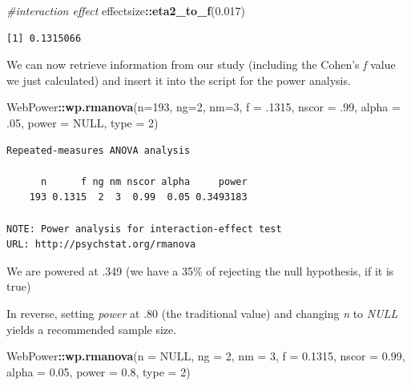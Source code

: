 \documentclass[
  11pt,
]{book}
\newenvironment{Shaded}{\begin{snugshade}}{\end{snugshade}}
\newcommand{\AttributeTok}[1]{\textcolor[rgb]{0.27,0.27,0.27}{#1}}
\newcommand{\CommentTok}[1]{\textcolor[rgb]{0.37,0.37,0.37}{\textit{#1}}}
\newcommand{\ConstantTok}[1]{\textcolor[rgb]{0.37,0.37,0.37}{#1}}
\newcommand{\DecValTok}[1]{\textcolor[rgb]{0.06,0.06,0.06}{#1}}
\newcommand{\FloatTok}[1]{\textcolor[rgb]{0.06,0.06,0.06}{#1}}
\newcommand{\FunctionTok}[1]{\textcolor[rgb]{0.27,0.27,0.27}{\textbf{#1}}}
\newcommand{\NormalTok}[1]{#1}
\newcommand{\SpecialCharTok}[1]{\textcolor[rgb]{0.43,0.43,0.43}{\textbf{#1}}}
\begin{document}
\begin{Shaded}
\begin{Highlighting}[]
\CommentTok{\#interaction effect}
\NormalTok{effectsize}\SpecialCharTok{::}\FunctionTok{eta2\_to\_f}\NormalTok{(}\FloatTok{0.017}\NormalTok{) }
\end{Highlighting}
\end{Shaded}

\begin{verbatim}
[1] 0.1315066
\end{verbatim}

We can now retrieve information from our study (including the Cohen's \emph{f} value we just calculated) and insert it into the script for the power analysis.

\begin{Shaded}
\begin{Highlighting}[]
\NormalTok{WebPower}\SpecialCharTok{::}\FunctionTok{wp.rmanova}\NormalTok{(}\AttributeTok{n=}\DecValTok{193}\NormalTok{, }\AttributeTok{ng=}\DecValTok{2}\NormalTok{, }\AttributeTok{nm=}\DecValTok{3}\NormalTok{, }\AttributeTok{f =}\NormalTok{ .}\DecValTok{1315}\NormalTok{, }\AttributeTok{nscor =}\NormalTok{ .}\DecValTok{99}\NormalTok{, }\AttributeTok{alpha =}\NormalTok{ .}\DecValTok{05}\NormalTok{, }\AttributeTok{power =} \ConstantTok{NULL}\NormalTok{, }\AttributeTok{type =} \DecValTok{2}\NormalTok{)}
\end{Highlighting}
\end{Shaded}

\begin{verbatim}
Repeated-measures ANOVA analysis

      n      f ng nm nscor alpha     power
    193 0.1315  2  3  0.99  0.05 0.3493183

NOTE: Power analysis for interaction-effect test
URL: http://psychstat.org/rmanova
\end{verbatim}

We are powered at .349 (we have a 35\% of rejecting the null hypothesis, if it is true)

In reverse, setting \emph{power} at .80 (the traditional value) and changing \emph{n} to \emph{NULL} yields a recommended sample size.

\begin{Shaded}
\begin{Highlighting}[]
\NormalTok{WebPower}\SpecialCharTok{::}\FunctionTok{wp.rmanova}\NormalTok{(}\AttributeTok{n =} \ConstantTok{NULL}\NormalTok{, }\AttributeTok{ng =} \DecValTok{2}\NormalTok{, }\AttributeTok{nm =} \DecValTok{3}\NormalTok{, }\AttributeTok{f =} \FloatTok{0.1315}\NormalTok{, }\AttributeTok{nscor =} \FloatTok{0.99}\NormalTok{,}
    \AttributeTok{alpha =} \FloatTok{0.05}\NormalTok{, }\AttributeTok{power =} \FloatTok{0.8}\NormalTok{, }\AttributeTok{type =} \DecValTok{2}\NormalTok{)}
\end{Highlighting}
\end{Shaded}
\end{document}
